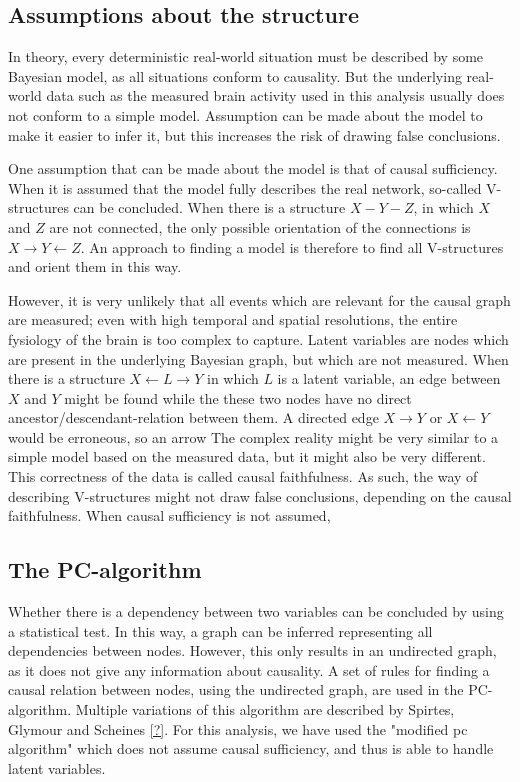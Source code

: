 \documentclass[a4paper, 10pt, english, twocolumn]{article}
\begin{document}
\subsection{Assumptions about the structure}
In theory, every deterministic real-world situation must be described by some Bayesian model, as all situations conform to causality.
But the underlying real-world data such as the measured brain activity used in this analysis usually does not conform to a simple model.
Assumption can be made about the model to make it easier to infer it, but this increases the risk of drawing false conclusions.

One assumption that can be made about the model is that of causal sufficiency. 
When it is assumed that the model fully describes the real network, so-called V-structures can be concluded. 
When there is a structure $X - Y - Z$, in which $X$ and $Z$ are not connected, the only possible orientation of the connections is $X \rightarrow Y \leftarrow Z$. %
An approach to finding a model is therefore to find all V-structures and orient them in this way.

However, it is very unlikely that all events which are relevant for the causal graph are measured; 
even with high temporal and spatial resolutions, the entire fysiology of the brain is too complex to capture.
Latent variables are nodes which are present in the underlying Bayesian graph, but which are not measured.
When there is a structure $X \leftarrow L \rightarrow Y$ in which $L$ is a latent variable, an edge between $X$ and $Y$ might be found while the these two nodes have no direct ancestor/descendant-relation between them.
A directed edge $X \rightarrow Y$ or $X \leftarrow Y$ would be erroneous, so an arrow 
The complex reality might be very similar to a simple model based on the measured data, but it might also be very different.
This correctness of the data is called causal faithfulness.
As such, the way of describing V-structures might not draw false conclusions, depending on the causal faithfulness.
When causal sufficiency is not assumed, 

\subsection{The PC-algorithm}
\cite{?}
Whether there is a dependency between two variables can be concluded by using a statistical test.
In this way, a graph can be inferred representing all dependencies between nodes.
However, this only results in an undirected graph, as it does not give any information about causality.
A set of rules for finding a causal relation between nodes, using the undirected graph, are used in the PC-algorithm. Multiple variations of this algorithm are described by Spirtes, Glymour and Scheines \ref{?}. For this analysis, we have used the "modified pc algorithm" which does not assume causal sufficiency, and thus is able to handle latent variables.
\end{document}

